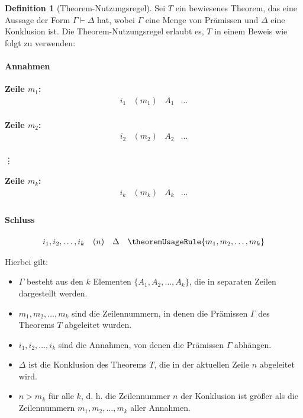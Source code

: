 \documentclass{book}
\theoremstyle{plain}
\theoremstyle{remark}
\theoremstyle{definition}
\newtheorem{definition}{Definition}[section]
\begin{document}
\begin{definition}[Theorem-Nutzungsregel]
\label{theoremUsageRule}
Sei \( T \) ein bewiesenes Theorem, das eine Aussage der Form \( \Gamma \vdash \Delta \) hat, wobei \( \Gamma \) eine Menge von Prämissen und \( \Delta \) eine Konklusion ist. Die Theorem-Nutzungsregel erlaubt es, \( T \) in einem Beweis wie folgt zu verwenden:

\paragraph{Annahmen}
\textbf{Zeile \(m_1\):}
\[
\begin{array}{llll}
   i_1& (m_1) & A_1 & \dots \\
\end{array}
\]

\textbf{Zeile \(m_2\):}
\[
\begin{array}{llll}
   i_2& (m_2) & A_2 & \dots \\
\end{array}
\]

\vdots

\textbf{Zeile \(m_k\):}
\[
\begin{array}{llll}
   i_k& (m_k) & A_k & \dots \\
\end{array}
\]

\paragraph{Schluss}
\[
\begin{array}{llll}
   i_1, i_2, \ldots, i_k & (n) & \Delta & \theoremUsageRule{m_1,m_2,\dots,m_k} \\
\end{array}
\]

Hierbei gilt:
\begin{itemize}
    \item \( \Gamma \) besteht aus den \( k \) Elementen \( \{A_1, A_2, \ldots, A_k\} \), die in separaten Zeilen dargestellt werden.
    \item \( m_1, m_2, \ldots, m_k \) sind die Zeilennummern, in denen die Prämissen \( \Gamma \) des Theorems \( T \) abgeleitet wurden.
    \item \( i_1, i_2, \ldots, i_k \) sind die Annahmen, von denen die Prämissen \( \Gamma \) abhängen.
    \item \( \Delta \) ist die Konklusion des Theorems \( T \), die in der aktuellen Zeile \( n \) abgeleitet wird.
    \item \( n > m_k \) für alle \( k \), d. h. die Zeilennummer \( n \) der Konklusion ist größer als die Zeilennummern \( m_1, m_2, \ldots, m_k \) aller Annahmen.
\end{itemize}
\end{definition}
\end{document}
